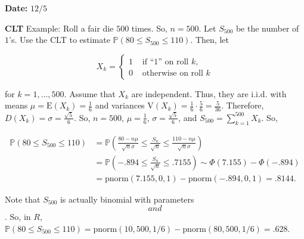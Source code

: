 \documentclass[12pt]{article}
\newcommand{\prob}[1]{\mathbb{P}(#1)}
\newcommand{\expected}[1]{\text{E}(#1)}
\newcommand{\variance}[1]{\text{V}(#1)}
\begin{document}

\begin{flushright}
\textbf{Date:} $12/5$
\end{flushright}

\noindent
\textbf{CLT} Example: Roll a fair die $500$ times. So, $n=500$. Let $S_{500}$ be the number of $1$'s. Use the CLT to estimate $\prob{80 \leq S_{500} \leq 110}$. Then, let

\[ X_k = \begin{cases} 
      1 & \text{ if ``$1$'' on roll } k, \\
      0 & \text{ otherwise on roll } k
      \end{cases} \]
      
\noindent
for $k = 1, \ldots, 500$. Assume that $X_k$ are independent. Thus, they are i.i.d. with means $\mu = \expected{X_k} = \frac{1}{6}$ and variances $\variance{X_k} = \frac{1}{6} \cdot \frac{5}{6} = \frac{5}{36}$. Therefore, $D(X_k) = \sigma = \frac{\sqrt{5}}{6}$. So, $n=500$, $\mu = \frac{1}{6}$, $\sigma = \frac{\sqrt{5}}{6}$, and $S_{500} = \sum_{k=1}^{500} X_k$. So,

\begin{align*}
\prob{80 \leq S_{500} \leq 110} &= \prob{\frac{80-n \mu}{\sqrt{n} \sigma} \leq \frac{S_n}{\sqrt{n}} \leq \frac{110-n \mu}{\sqrt{n} \sigma}} \\
&= \prob{-.894 \leq \frac{S_n}{\sqrt{n}} \leq .7155} \sim \Phi(7.155) - \Phi(-.894) \\
&= \text{pnorm}(7.155,0,1) - \text{pnorm}(-.894,0,1) = .8144. 
\end{align*}

\noindent
Note that $S_{500}$ is actually binomial with parameters $$ and $$. So, in $R$, $\prob{80 \leq S_{500} \leq 110} = \text{pnorm}(10,500,1/6) - \text{pnorm}(80,500,1/6) = .628$.
\end{document}
